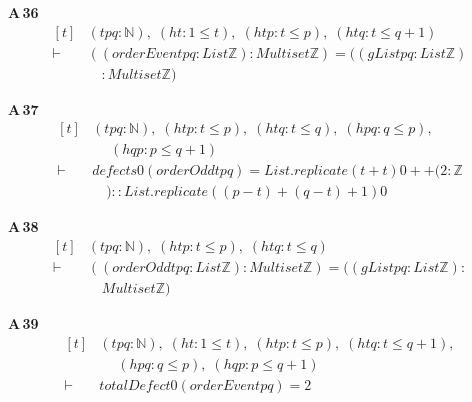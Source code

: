 \noindent\textbf{A\,36}\quad{}
{\footnotesize\[ \begin{aligned}[t]
&(\mathit{t} \mathit{p} \mathit{q} : \mathbb{N} ),\; (\mathit{ht} : 1 \leq \mathit{t}),\; (\mathit{htp} : \mathit{t} \leq \mathit{p}),\; (\mathit{htq} : \mathit{t} \leq \mathit{q} + 1)\\
\vdash\;&((\mathit{orderEven} \mathit{t} \mathit{p} \mathit{q} : \mathit{List} \mathbb{Z} ) : \mathit{Multiset} \mathbb{Z} ) = ((\mathit{gList} \mathit{p} \mathit{q} : \mathit{List} \mathbb{Z} )\\
&\quad : \mathit{Multiset} \mathbb{Z} )
\end{aligned} \]}

\noindent\textbf{A\,37}\quad{}
{\footnotesize\[ \begin{aligned}[t]
&(\mathit{t} \mathit{p} \mathit{q} : \mathbb{N} ),\; (\mathit{htp} : \mathit{t} \leq \mathit{p}),\; (\mathit{htq} : \mathit{t} \leq \mathit{q}),\; (\mathit{hpq} : \mathit{q} \leq \mathit{p}),\\
&\quad \; (\mathit{hqp} : \mathit{p} \leq \mathit{q} + 1)\\
\vdash\;&\mathit{defects} 0 (\mathit{orderOdd} \mathit{t} \mathit{p} \mathit{q}) = \mathit{List}.\mathit{replicate} (\mathit{t} + \mathit{t}) 0 ++ (2 : \mathbb{Z}\\
&\quad ) :: \mathit{List}.\mathit{replicate} ((\mathit{p} - \mathit{t}) + (\mathit{q} - \mathit{t}) + 1) 0
\end{aligned} \]}

\noindent\textbf{A\,38}\quad{}
{\footnotesize\[ \begin{aligned}[t]
&(\mathit{t} \mathit{p} \mathit{q} : \mathbb{N} ),\; (\mathit{htp} : \mathit{t} \leq \mathit{p}),\; (\mathit{htq} : \mathit{t} \leq \mathit{q})\\
\vdash\;&((\mathit{orderOdd} \mathit{t} \mathit{p} \mathit{q} : \mathit{List} \mathbb{Z} ) : \mathit{Multiset} \mathbb{Z} ) = ((\mathit{gList} \mathit{p} \mathit{q} : \mathit{List} \mathbb{Z} ) :\\
&\quad \mathit{Multiset} \mathbb{Z} )
\end{aligned} \]}

\noindent\textbf{A\,39}\quad{}
{\footnotesize\[ \begin{aligned}[t]
&(\mathit{t} \mathit{p} \mathit{q} : \mathbb{N} ),\; (\mathit{ht} : 1 \leq \mathit{t}),\; (\mathit{htp} : \mathit{t} \leq \mathit{p}),\; (\mathit{htq} : \mathit{t} \leq \mathit{q} + 1),\\
&\quad \; (\mathit{hpq} : \mathit{q} \leq \mathit{p}),\; (\mathit{hqp} : \mathit{p} \leq \mathit{q} + 1)\\
\vdash\;&\mathit{totalDefect} 0 (\mathit{orderEven} \mathit{t} \mathit{p} \mathit{q}) = 2
\end{aligned} \]}

